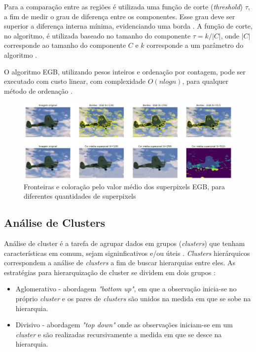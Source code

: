 \begin{document}
Para a comparação entre as regiões é utilizada uma função de corte (\textit{threshold}) $\tau$, a fim de medir o grau de diferença entre os componentes. Esse grau deve ser superior a diferença interna mínima, evidenciando uma borda \cite{FELZENSZWALB}. A função de corte, no algoritmo, é utilizada baseado no tamanho do componente $\tau=k/|C|$, onde $|C|$ corresponde ao tamanho do componente $C$ e $k$ corresponde a um parâmetro do algoritmo \cite{FELZENSZWALB}.

O algoritmo EGB, utilizando pesos inteiros e ordenação por contagem, pode ser executado com custo linear, com complexidade $O(nlogn)$, para qualquer método de ordenação \cite{FELZENSZWALB}. 

\begin{figure}[ht]
\centering
\includegraphics[width=1.\textwidth]{felz_segmentation_compare.png}
\caption{Fronteiras e coloração pelo valor médio dos superpixels EGB, para diferentes quantidades de superpixels}
\label{fig:EGB}
\end{figure}


\subsection{Análise de Clusters} \label{ssec:clusters}

Análise de cluster é a tarefa de agrupar dados em grupos (\textit{clusters}) que tenham características em comum, sejam signinficativos e/ou úteis \cite{CLUSTER_HIER}. \textit{Clusters} hierárquicos correspondem a análise de \textit{clusters} a fim de buscar hierarquias entre eles. As estratégias para hierarquização de cluster se dividem em dois grupos \cite{ROKACH}:

\begin{itemize}
 \item Aglomerativo - abordagem \textit{"bottom up"}, em que a observação inicia-se no próprio \textit{cluster} e os pares de \textit{clusters} são unidos na medida em que se sobe na hierarquia. 
 \item Divisivo - abordagem \textit{"top down"} onde as observações iniciam-se em um \textit{cluster} e são realizadas recursivamente a medida em que se desce na hierarquia.
\end{itemize}
\end{document}
